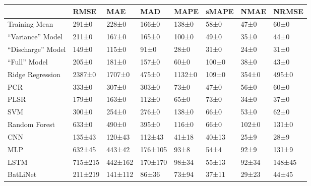 \begin{tabular}{llllllll}
\toprule
 & RMSE & MAE & MAD & MAPE & sMAPE & NMAE & NRMSE \\
\midrule
Training Mean & 291±0 & 228±0 & 166±0 & 138±0 & 58±0 & 47±0 & 60±0 \\
``Variance'' Model & 211±0 & 167±0 & 165±0 & 100±0 & 49±0 & 35±0 & 44±0 \\
``Discharge'' Model & 149±0 & 115±0 & 91±0 & 28±0 & 31±0 & 24±0 & 31±0 \\
``Full'' Model & 205±0 & 181±0 & 157±0 & 60±0 & 100±0 & 38±0 & 43±0 \\
Ridge Regression & 2387±0 & 1707±0 & 475±0 & 1132±0 & 109±0 & 354±0 & 495±0 \\
PCR & 333±0 & 307±0 & 303±0 & 73±0 & 47±0 & 56±0 & 60±0 \\
PLSR & 179±0 & 163±0 & 112±0 & 65±0 & 73±0 & 34±0 & 37±0 \\
SVM & 300±0 & 254±0 & 276±0 & 138±0 & 66±0 & 53±0 & 62±0 \\
Random Forest & 633±0 & 490±0 & 395±0 & 116±0 & 66±0 & 102±0 & 131±0 \\
CNN & 135±43 & 120±43 & 112±43 & 41±18 & 40±13 & 25±9 & 28±9 \\
MLP & 632±45 & 443±42 & 176±105 & 93±8 & 54±4 & 92±9 & 131±9 \\
LSTM & 715±215 & 442±162 & 170±170 & 98±34 & 55±13 & 92±34 & 148±45 \\
BatLiNet & 211±219 & 141±112 & 86±36 & 73±94 & 37±11 & 29±23 & 44±45 \\
\bottomrule
\end{tabular}